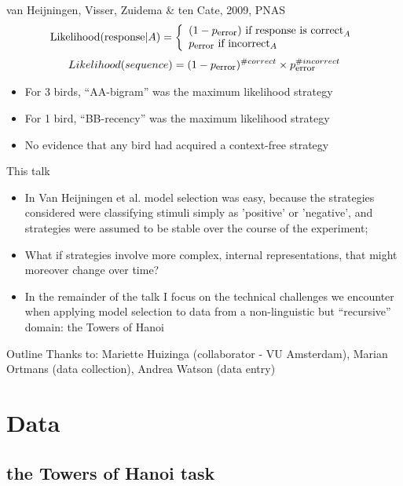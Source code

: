\documentclass[xcolor=table]{beamer}
\newcommand{\sub}[1]{\mbox{\footnotesize #1}}
\begin{document}
\begin{frame}{van Heijningen, Visser, Zuidema \& ten Cate, 2009, PNAS}
\[
\mbox{Likelihood}(\mbox{response}|A) = \left\{
  \begin{array}[c]{l}
 (1-p_{\sub{error}}) \mbox{ if response is correct}_A\\
 p_{\sub{error}} \mbox{ if incorrect}_A
  \end{array}
\right.
\]
\pause
\[
Likelihood(sequence) = (1-p_{\sub{error}})^{\#correct} \times p_{\sub{error}}^{\#incorrect}
\]

\pause
  \begin{itemize}
  \item For 3 birds, ``AA-bigram'' was the maximum likelihood strategy
  \item For 1 bird, ``BB-recency'' was the maximum likelihood strategy
  \item No evidence that any bird had acquired a context-free strategy
  \end{itemize}
\end{frame}


\begin{frame}{This talk}
  \begin{itemize}
  \item In Van Heijningen et al. model selection was easy, because the
    strategies considered were classifying stimuli simply as 'positive' or
    'negative', and strategies were assumed to be stable over the
    course of the experiment;
  \item What if strategies involve more complex, internal
    representations, that might moreover change over time?
  \item In the remainder of the talk I focus on the technical
    challenges we encounter when applying model selection to data from
    a non-linguistic but ``recursive'' domain: the Towers of Hanoi
  \end{itemize}
\end{frame}

\begin{frame}{Outline}
\tableofcontents
Thanks to: Mariette Huizinga (collaborator - VU Amsterdam), Marian Ortmans (data collection), Andrea Watson (data entry)
\end{frame}

\section{Data}
\label{sec:data}

\subsection{the Towers of Hanoi task}
\end{document}
